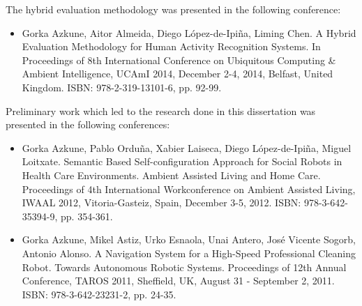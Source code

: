 The hybrid evaluation methodology was presented in the following conference:

\begin{itemize}
 \item Gorka Azkune, Aitor Almeida, Diego López-de-Ipiña, Liming Chen. A Hybrid Evaluation Methodology for Human Activity Recognition Systems. In Proceedings of 8th International Conference on Ubiquitous Computing \& Ambient Intelligence, UCAmI 2014, December 2-4, 2014, Belfast, United Kingdom. ISBN: 978-2-319-13101-6, pp. 92-99.
\end{itemize}

Preliminary work which led to the research done in this dissertation was presented in the following conferences:

\begin{itemize}
 \item Gorka Azkune, Pablo Orduña, Xabier Laiseca, Diego López-de-Ipiña, Miguel Loitxate. Semantic Based Self-configuration Approach for Social Robots in Health Care Environments. Ambient Assisted Living and Home Care. Proceedings of 4th International Workconference on Ambient Assisted Living, IWAAL 2012, Vitoria-Gasteiz, Spain, December 3-5, 2012. ISBN: 978-3-642-35394-9, pp. 354-361.
 \item Gorka Azkune, Mikel Astiz, Urko Esnaola, Unai Antero, José Vicente Sogorb, Antonio Alonso. A Navigation System for a High-Speed Professional Cleaning Robot. Towards Autonomous Robotic Systems. Proceedings of 12th Annual Conference, TAROS 2011, Sheffield, UK, August 31 - September 2, 2011. ISBN: 978-3-642-23231-2, pp. 24-35.
\end{itemize}


